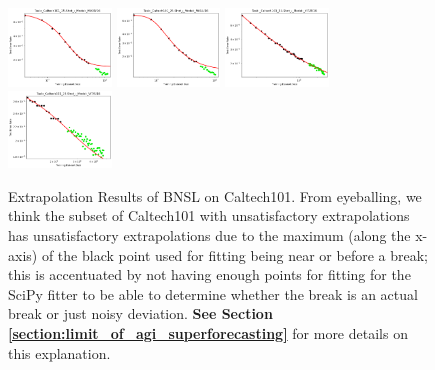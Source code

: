 \documentclass{article} %
\begin{document}
\begin{figure}
\includegraphics[width=0.245\textwidth]{figures/scaling_laws_benchmark_dataset_plots/caltech_25shot___MiX_B_16.png}
\includegraphics[width=0.245\textwidth]{figures/scaling_laws_benchmark_dataset_plots/caltech_25shot___MiX_L_16.png}
\includegraphics[width=0.245\textwidth]{figures/scaling_laws_benchmark_dataset_plots/caltech_25shot___ViT_B_16.png}
\includegraphics[width=0.245\textwidth]{figures/scaling_laws_benchmark_dataset_plots/caltech_25shot___ViT_S_16.png}

    \caption{
    Extrapolation Results of BNSL on Caltech101. From eyeballing, we think the subset of Caltech101 with unsatisfactory extrapolations has unsatisfactory extrapolations due to the maximum (along the x-axis) of the black point used for fitting being near or before a break; this is accentuated by not having enough points for fitting for the SciPy fitter to be able to determine whether the break is an actual break or just noisy deviation. \textbf{See Section \ref{section:limit_of_agi_superforecasting}} for more details on this explanation.
    }
    \label{fig:scaling_laws_benchmark_dataset__caltech}
\end{figure}

\clearpage
\end{document}
